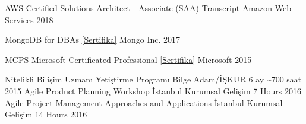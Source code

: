 
    \begin{cvhonors}
        \cvhonor
        {AWS Certified Solutions Architect - Associate (SAA)}
        {\href{https://www.certmetrics.com/amazon/public/transcript.aspx?transcript=HK7EEBT12EE41BGN}{Transcript}}
        {Amazon Web Services}
        {2018}

        \cvhonor
        {MongoDB for DBAs}
        {\href{http://bit.ly/guneysu-mongodb-for-dba-certificate}{[Sertifika]}}
        {Mongo Inc.}
        {2017}

        \cvhonor
        {MCPS}
        {Microsoft Certificated Professional \href{http://docs.kariyer.net/uploadfiles/executive/0000/0000/9267/488/Certificate_1.pdf?filesec=5dY0D3Kbe72WC8jXyTXZtsqpxLi1WwOJJWy91Xr06Ix8SFBJvKdhj3YKHFnw7RaWqfs54O4Ya9qEBQFCddGhbqJe369hJjyh!e!}{[Sertifika]}}
        {Microsoft}
        {2015}
    \end{cvhonors}


    \begin{cvhonors} 
        \cvhonor
            {Nitelikli Bilişim Uzmanı Yetiştirme Programı}
            {Bilge Adam/İŞKUR}            
            {6 ay \textasciitilde 700 saat}
            {2015}
        \cvhonor
            {Agile Product Planning Workshop}
            {İstanbul Kurumsal Gelişim}            
            {7 Hours}
            {2016}
        \cvhonor
            {Agile Project Management Approaches and Applications}
            {İstanbul Kurumsal Gelişim}            
            {14 Hours}
            {2016}            
    \end{cvhonors}   

